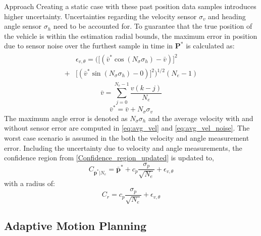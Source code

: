 \begin{section}{Approach}
Creating a static case with these past position data samples introduces higher uncertainty. Uncertainties regarding the velocity sensor $\sigma_v$ and heading angle sensor $\sigma_h$ need to be accounted for. To guarantee that the true position of the vehicle is within the estimation radial bounds, the maximum error in position due to sensor noise over the furthest sample in time in $\bm{P}^*$ is calculated as:
    \begin{align}
    \begin{split}
	&\epsilon_{v,\theta}=\Big( \big[(\bar{v}^* \cos(N_{\sigma}\sigma_h) - \bar{v}) \big]^2 \\
	+ & \big[ (\bar{v}^* \sin(N_{\sigma}\sigma_h) - 0) \big]^2 \Big) ^{1/2} (N_e-1)
	\end{split}
	\end{align}
    \begin{equation}
    \label{eq:avg_vel}
    \bar{v}=\sum_{j=0}^{N_e-1} \frac{v(k-j)}{N_e}
	\end{equation}
    \begin{equation}
    \label{eq:avg_vel_noise}
	\bar{v}^{*}=\bar{v}+N_{\sigma}\sigma_v 
	\end{equation}
The maximum angle error is denoted as $N_{\sigma}\sigma_h$  and the average velocity with and without sensor error are computed in \eqref{eq:avg_vel} and \eqref{eq:avg_vel_noise}. The worst case scenario is assumed in the both the velocity and angle measurement error. Including the uncertainty due to velocity and angle measurements, the confidence region from \eqref{Confidence_region_updated} is updated to,
    \begin{equation}
    \label{Confidence_region_updated2}
		C_{\bar{\bm{p}}^*|N_e} = \bar{\bm{p}}^* + c_p\frac{\sigma_p}{\sqrt{N_e}} + \epsilon_{v,\theta}
	\end{equation}
with a radius of:
    \begin{equation}
    \label{Confidence_radius2}
		C_r = c_p\frac{\sigma_p}{\sqrt{N_e}} + \epsilon_{v,\theta}
	\end{equation}

\subsection{Adaptive Motion Planning}



\end{section}
